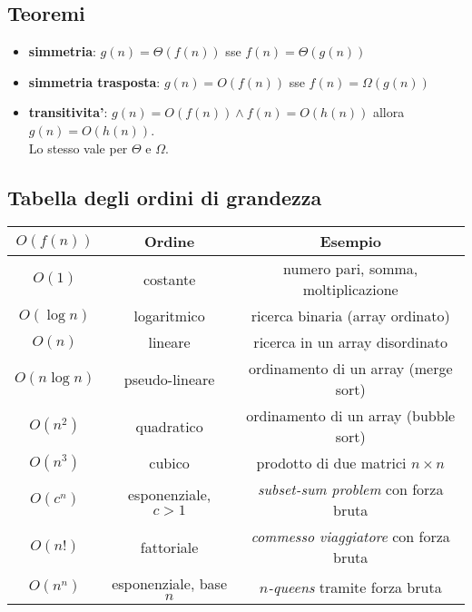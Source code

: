 \documentclass{article}
\begin{document}
\subsection{Teoremi}

\begin{itemize}
  \item \textbf{simmetria}: $g(n) = \Theta(f(n))$ sse $f(n) = \Theta(g(n))$
  \item \textbf{simmetria trasposta}: $g(n) = O(f(n))$ sse $f(n) = \Omega(g(n))$
  \item \textbf{transitivita'}: $g(n) = O(f(n)) \wedge f(n) = O(h(n))$ allora $g(n) = O(h(n))$. \\
        Lo stesso vale per $\Theta$ e $\Omega$.
\end{itemize}

\subsection{Tabella degli ordini di grandezza}

\begin{center}
\begin{tabular}{ |c|c|c| } 
  \hline
  $O(f(n))$ & Ordine & Esempio \\
  \hline\hline
  $O(1)$ & costante & numero pari, somma, moltiplicazione \\ 
  \hline
  $O(\log n)$ & logaritmico & ricerca binaria (array ordinato) \\ 
  \hline
  $O(n)$ & lineare & ricerca in un array disordinato \\ 
  \hline
  $O(n \log n)$ & pseudo-lineare & ordinamento di un array (merge sort) \\ 
  \hline
  $O(n^2)$ & quadratico & ordinamento di un array (bubble sort) \\ 
  \hline
  $O(n^3)$ & cubico & prodotto di due matrici $n \times n$ \\ 
  \hline
  $O(c^n)$ & esponenziale, $c > 1$ & \emph{subset-sum problem} con forza bruta \\ 
  \hline
  $O(n!)$ & fattoriale & \emph{commesso viaggiatore} con forza bruta \\ 
  \hline
  $O(n^n)$ & esponenziale, base $n$ & \emph{$n$-queens} tramite forza bruta \\ 
  \hline
\end{tabular}
\end{center}
\end{document}
